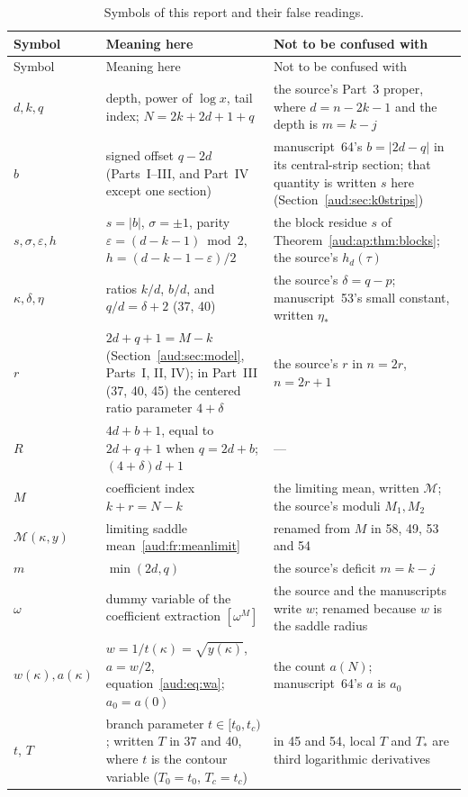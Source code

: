 \documentclass[11pt,a4paper]{article}
\numberwithin{equation}{section}
\begin{document}
{\small
\begin{longtable}{@{}>{\raggedright\arraybackslash}p{}
 >{\raggedright\arraybackslash}p{}
 >{\raggedright\arraybackslash}p{}@{}}
\caption{Symbols of this report and their false readings.}\label{aud:tab:notation}\\
\toprule
Symbol & Meaning here & Not to be confused with\\
\midrule\endfirsthead
\toprule
Symbol & Meaning here & Not to be confused with\\
\midrule\endhead
$d,k,q$ & depth, power of $\log x$, tail index; $N=2k+2d+1+q$ & the source's Part~3 proper, where $d=n-2k-1$ and the depth is $m=k-j$\\
$b$ & signed offset $q-2d$ (Parts~I--III, and Part~IV except one section) & manuscript~64's $b=|2d-q|$ in its central-strip section; that quantity is written $s$ here (Section~\ref{aud:sec:k0strips})\\
$s,\sigma,\varepsilon,h$ & $s=|b|$, $\sigma=\pm1$, parity $\varepsilon=(d-k-1)\bmod 2$, $h=(d-k-1-\varepsilon)/2$ & the block residue $s$ of Theorem~\ref{aud:ap:thm:blocks}; the source's $h_d(\tau)$\\
$\kappa,\delta,\eta$ & ratios $k/d$, $b/d$, and $q/d=\delta+2$ (37, 40) & the source's $\delta=q-p$; manuscript~53's small constant, written $\eta_*$\\
$r$ & $2d+q+1=M-k$ (Section~\ref{aud:sec:model}, Parts~I, II, IV); in Part~III (37, 40, 45) the centered ratio parameter $4+\delta$ & the source's $r$ in $n=2r$, $n=2r+1$\\
$R$ & $4d+b+1$, equal to $2d+q+1$ when $q=2d+b$; $(4+\delta)d+1$ & ---\\
$M$ & coefficient index $k+r=N-k$ & the limiting mean, written $\mathcal M$; the source's moduli $M_1,M_2$\\
$\mathcal M(\kappa,y)$ & limiting saddle mean~\eqref{aud:fr:meanlimit} & renamed from $M$ in 58, 49, 53 and 54\\
$m$ & $\min(2d,q)$ & the source's deficit $m=k-j$\\
$\omega$ & dummy variable of the coefficient extraction $[\omega^M]$ & the source and the manuscripts write $w$; renamed because $w$ is the saddle radius\\
$w(\kappa),a(\kappa)$ & $w=1/t(\kappa)=\sqrt{y(\kappa)}$, $a=w/2$, equation~\eqref{aud:eq:wa}; $a_0=a(0)$ & the count $a(N)$; manuscript~64's $a$ is $a_0$\\
$t$, $T$ & branch parameter $t\in[t_0,t_c)$; written $T$ in 37 and 40, where $t$ is the contour variable ($T_0=t_0$, $T_c=t_c$) & in 45 and 54, local $T$ and $T_*$ are third logarithmic derivatives\\

\end{longtable}}
\end{document}
